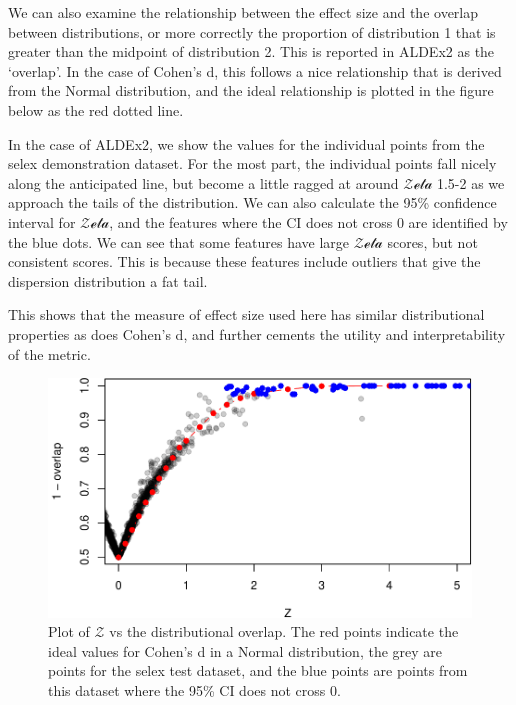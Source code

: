 \documentclass[onecolumn]{article}
\begin{document}
\clearpage

We can also examine the relationship between the effect size and the
overlap between distributions, or more correctly the proportion of
distribution 1 that is greater than the midpoint of distribution 2. This
is reported in ALDEx2 as the `overlap'. In the case of Cohen's d, this
follows a nice relationship that is derived from the Normal
distribution, and the ideal relationship is plotted in the figure below
as the red dotted line.

In the case of ALDEx2, we show the values for the individual points from
the selex demonstration dataset. For the most part, the individual
points fall nicely along the anticipated line, but become a little
ragged at around \(\mathcal{Zeta}\) 1.5-2 as we approach the tails of
the distribution. We can also calculate the 95\% confidence interval for
\(\mathcal{Zeta}\), and the features where the CI does not cross 0 are
identified by the blue dots. We can see that some features have large
\(\mathcal{Zeta}\) scores, but not consistent scores. This is because
these features include outliers that give the dispersion distribution a
fat tail.

This shows that the measure of effect size used here has similar
distributional properties as does Cohen's d, and further cements the
utility and interpretability of the metric.

\begin{figure}
\centering
\includegraphics{effect_supplement_files/figure-latex/R-overlap-1.pdf}
\caption{Plot of \(\mathcal{Z}\) vs the distributional overlap. The red
points indicate the ideal values for Cohen's d in a Normal distribution,
the grey are points for the selex test dataset, and the blue points are
points from this dataset where the 95\% CI does not cross 0.}
\end{figure}
\end{document}
